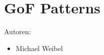 \chapter{GoF Patterns}
\label{sec:gof}

Autoren:
\begin{itemize}
	\item Michael Weibel
\end{itemize}


